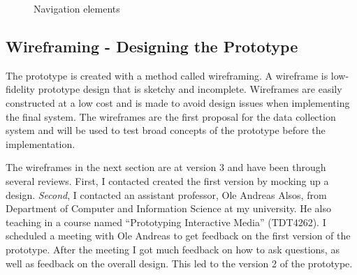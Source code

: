   \begin{figure}[H]
    \centering
    \caption{Navigation elements}
    \label{fig:navigation}
  \end{figure}

  \subsection{Wireframing - Designing the Prototype}

  The prototype is created with a method called wireframing. A wireframe is low-fidelity prototype design that is sketchy and incomplete. Wireframes are easily constructed at a low cost and is made to avoid design issues when implementing the final system. The wireframes are the first proposal for the data collection system and will be used to test broad concepts of the prototype before the implementation.

  The wireframes in the next section are at version 3 and have been through several reviews. First, I contacted created the first version by mocking up a design. {\it Second}, I contacted an assistant professor, Ole Andreas Alsos, from Department of Computer and Information Science at my university. He also teaching in a course named ``Prototyping Interactive Media'' (TDT4262). I scheduled a meeting with Ole Andreas to get feedback on the first version of the prototype. After the meeting I got much feedback on how to ask questions, as well as feedback on the overall design. This led to the version 2 of the prototype.

